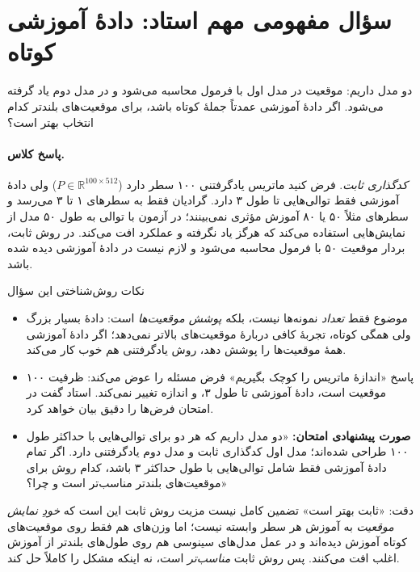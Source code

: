 \section{سؤال مفهومی مهم استاد: دادهٔ آموزشی کوتاه}
\label{sec:ch10-exam}
دو مدل داریم: موقعیت در مدل اول با فرمول محاسبه می‌شود و در مدل دوم یاد گرفته می‌شود. اگر دادهٔ آموزشی عمدتاً جملهٔ کوتاه باشد، برای موقعیت‌های بلندتر کدام انتخاب بهتر است؟

\paragraph{پاسخ کلاس.} \emph{کدگذاری ثابت}. فرض کنید ماتریس یادگرفتنی ۱۰۰ سطر دارد ($P\in\mathbb{R}^{100\times 512}$) ولی دادهٔ آموزشی فقط توالی‌هایی تا طول ۳ دارد. گرادیان فقط به سطرهای ۱ تا ۳ می‌رسد و سطرهای مثلاً ۵۰ یا ۸۰ آموزش مؤثری نمی‌بینند؛ در آزمون با توالی به طول ۵۰ مدل از نمایش‌هایی استفاده می‌کند که هرگز یاد نگرفته و عملکرد افت می‌کند. در روش ثابت، بردار موقعیت ۵۰ با فرمول محاسبه می‌شود و لازم نیست در دادهٔ آموزشی دیده شده باشد.

\begin{exambox}{نکات روش‌شناختی این سؤال}
\begin{itemize}
  \item موضوع فقط \emph{تعداد} نمونه‌ها نیست، بلکه \emph{پوشش موقعیت‌ها} است: دادهٔ بسیار بزرگ ولی همگی کوتاه، تجربهٔ کافی دربارهٔ موقعیت‌های بالاتر نمی‌دهد؛ اگر دادهٔ آموزشی همهٔ موقعیت‌ها را پوشش دهد، روش یادگرفتنی هم خوب کار می‌کند.
  \item پاسخ «اندازهٔ ماتریس را کوچک بگیریم» فرض مسئله را عوض می‌کند: ظرفیت ۱۰۰ موقعیت است، دادهٔ آموزشی تا طول ۳، و اندازه تغییر نمی‌کند. استاد گفت در امتحان فرض‌ها را دقیق بیان خواهد کرد.
  \item \textbf{صورت پیشنهادی امتحان:} «دو مدل داریم که هر دو برای توالی‌هایی با حداکثر طول ۱۰۰ طراحی شده‌اند؛ مدل اول کدگذاری ثابت و مدل دوم یادگرفتنی دارد. اگر تمام دادهٔ آموزشی فقط شامل توالی‌هایی با طول حداکثر ۳ باشد، کدام روش برای موقعیت‌های بلندتر مناسب‌تر است و چرا؟»
\end{itemize}
\end{exambox}

\begin{correctionbox}{دقت: «ثابت بهتر است» تضمین کامل نیست}
مزیت روش ثابت این است که \emph{خودِ نمایش موقعیت} به آموزش هر سطر وابسته نیست؛ اما وزن‌های  هم فقط روی موقعیت‌های کوتاه آموزش دیده‌اند و در عمل مدل‌های سینوسی هم روی طول‌های بلندتر از آموزش اغلب افت می‌کنند. پس روش ثابت \emph{مناسب‌تر} است، نه اینکه مشکل را کاملاً حل کند.
\end{correctionbox}

